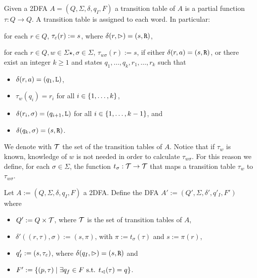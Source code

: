 \begin{defn}
	Given a 2DFA $A=(Q,\Sigma,\delta,q_I,F)$ a transition table of $A$ is a partial function $\tau:Q\to Q$.
	A transition table is assigned to each word. In particular:
	\begin{rules}
		\item for each $r\in Q$, $\tau_\varepsilon(r):=s$, where $\delta(r,\rhd)=(s,\mathtt R)$,
		\item for each $r\in Q,w\in\Sigma\star,\sigma\in\Sigma$, $\tau_{w\sigma}(r):=s$, if either $\delta(r,a)=(s,\mathtt R)$, or there exist an integer $k\ge1$ and states $q_1,\dots,q_k,r_1,\dots,r_k$ such that
		\begin{itemize}
			\item $\delta(r,a)=(q_1,\mathtt L)$,
			\item $\tau_w(q_i)=r_i$ for all $i\in\{1,\dots,k\}$,
			\item $\delta(r_i,\sigma)=(q_{i+1},\mathtt L)$ for all $i\in\{1,\dots,k-1\}$, and
			\item $\delta(q_k,\sigma)=(s,\mathtt R)$.
		\end{itemize}
	\end{rules}
	We denote with $\mathcal T$ the set of the transition tables of $A$.
	Notice that if $\tau_w$ is known, knowledge of $w$ is not needed in order to calculate $\tau_{w\sigma}$.
	For this reason we define, for each $\sigma\in\Sigma$, the function $t_\sigma:\mathcal T\to\mathcal T$ that maps a transition table $\tau_w$ to $\tau_{w\sigma}$.
\end{defn}



Let $A:=(Q,\Sigma,\delta,q_I,F)$ a 2DFA.
Define the DFA $A':=(Q',\Sigma,\delta',q'_I,F')$ where
\begin{itemize}
	\item $Q':=Q\times\mathcal T$, where $\mathcal T$ is the set of transition tables of $A$,
	\item $\delta'((r,\tau),\sigma):=(s,\pi)$, with $\pi:=t_\sigma(\tau)$ and $s:=\pi(r)$,
	\item $q'_I:=(s,\tau_\varepsilon)$, where $\delta(q_I,\rhd)=(s,\mathtt R)$ and
	\item $F':=\{(p,\tau)\mid \exists q_f\in F \text{ s.t. } t_\lhd(\tau)=q\}$.
\end{itemize}

